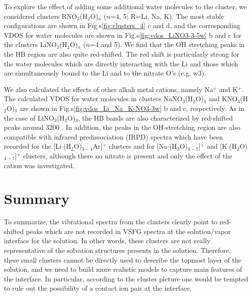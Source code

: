 To explore the effect of adding some additional water molecules to
the cluster, we considered clusters RNO$_3$(H$_2$O)$_n$ ($n$=4, 5; R=Li, Na, K).
The most stable configurations are shown in Fig.s\thinspace\ref{fig:clusters_4} c and d,
and the corresponding VDOS for water molecules are shown in
Fig.s\thinspace\ref{fig:vdos_LiNO3-3-5w} b and c for the clusters LiNO$_3$(H$_2$O)$_n$
($n$=4 and 5). We find that the OH stretching peaks in the HB region are also quite red-shifted.
The red shift is particularly strong for the water molecules which are directly interacting with
the Li and those which are simultaneously bound to the Li and to the nitrate O's (e.g. w3).

%

We also calculated the effects of other alkali metal cations, namely Na$^+$ and K$^+$. 
The calculated VDOS for water molecules in clusters NaNO$_3$(H$_2$O)$_3$ and KNO$_3$(H$_2$O)$_3$ are shown in 
Fig.s\thinspace\ref{fig:vdos_Li_Na_K-NO3-3w} b and c, respectively. As in the case of LiNO$_3$(H$_2$O)$_3$, the HB 
bands are also characterized by red-shifted peaks around 3200 \centimeter.
In addition, the peaks in the OH-stretching region are also compatible with infrared predissociation
(IRPD) spectra which have been recorded for the [Li$\cdot$(H$_2$O)$_{3-4}$Ar]$^+$
clusters\cite{rodriguez2011, Miller2008, Miller2008b}
and for [Na$\cdot$(H$_2$O)$_{4-7}$]$^+$ and [K$\cdot$(H$_2$O)$_{4-7}$]$^+$ clusters\cite{beck2011}, although there no
nitrate is present and only the effect of the cation was investigated.
%	
\section{Summary}
To summarize, the vibrational spectra from the clusters clearly point to red-shifted peaks which are not 
recorded in VSFG spectra at the solution/vapor interface for the \LiN solution. 
In other words, these clusters are not really representative of the solvation structures presents in the \LiN solution.
Therefore, these small clusters cannot be directly used to describe the topmost layer of the \LiN solution, 
and we need to build more realistic models to capture main features of the interface. 
In particular, according to the cluster picture one would be tempted to rule out the possibility of a contact 
ion pair at the interface.

